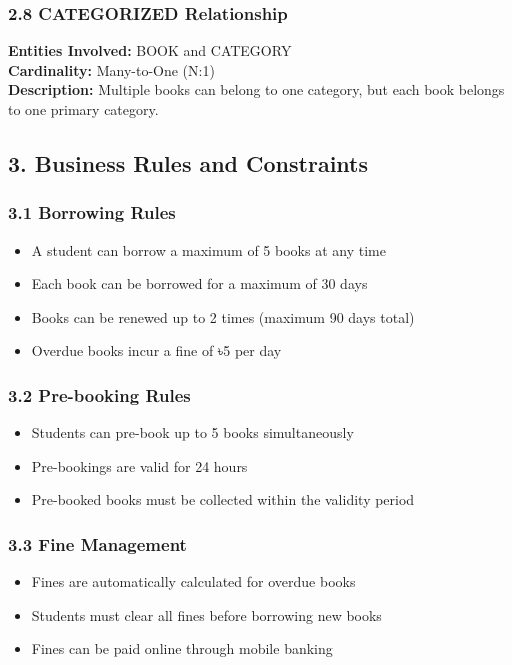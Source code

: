 \documentclass[12pt,a4paper]{article}
\begin{document}
\subsubsection{2.8 CATEGORIZED Relationship}
\textbf{Entities Involved:} BOOK and CATEGORY \\
\textbf{Cardinality:} Many-to-One (N:1) \\
\textbf{Description:} Multiple books can belong to one category, but each book belongs to one primary category.

\subsection{3. Business Rules and Constraints}

\subsubsection{3.1 Borrowing Rules}
\begin{itemize}
    \item A student can borrow a maximum of 5 books at any time
    \item Each book can be borrowed for a maximum of 30 days
    \item Books can be renewed up to 2 times (maximum 90 days total)
    \item Overdue books incur a fine of ৳5 per day
\end{itemize}

\subsubsection{3.2 Pre-booking Rules}
\begin{itemize}
    \item Students can pre-book up to 5 books simultaneously
    \item Pre-bookings are valid for 24 hours
    \item Pre-booked books must be collected within the validity period
\end{itemize}

\subsubsection{3.3 Fine Management}
\begin{itemize}
    \item Fines are automatically calculated for overdue books
    \item Students must clear all fines before borrowing new books
    \item Fines can be paid online through mobile banking
\end{itemize}
\end{document}
